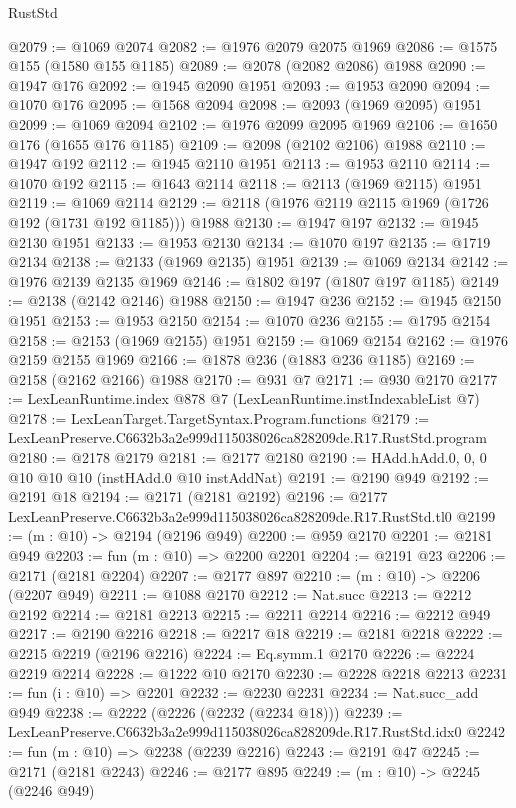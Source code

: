 \begin{lexlean}{RustStd}
\begin{coremodule}
@2079 := @1069 @2074
@2082 := @1976 @2079 @2075 @1969
@2086 := @1575 @155 (@1580 @155 @1185)
@2089 := @2078 (@2082 @2086) @1988
@2090 := @1947 @176
@2092 := @1945 @2090 @1951
@2093 := @1953 @2090
@2094 := @1070 @176
@2095 := @1568 @2094
@2098 := @2093 (@1969 @2095) @1951
@2099 := @1069 @2094
@2102 := @1976 @2099 @2095 @1969
@2106 := @1650 @176 (@1655 @176 @1185)
@2109 := @2098 (@2102 @2106) @1988
@2110 := @1947 @192
@2112 := @1945 @2110 @1951
@2113 := @1953 @2110
@2114 := @1070 @192
@2115 := @1643 @2114
@2118 := @2113 (@1969 @2115) @1951
@2119 := @1069 @2114
@2129 := @2118 (@1976 @2119 @2115 @1969 (@1726 @192 (@1731 @192 @1185))) @1988
@2130 := @1947 @197
@2132 := @1945 @2130 @1951
@2133 := @1953 @2130
@2134 := @1070 @197
@2135 := @1719 @2134
@2138 := @2133 (@1969 @2135) @1951
@2139 := @1069 @2134
@2142 := @1976 @2139 @2135 @1969
@2146 := @1802 @197 (@1807 @197 @1185)
@2149 := @2138 (@2142 @2146) @1988
@2150 := @1947 @236
@2152 := @1945 @2150 @1951
@2153 := @1953 @2150
@2154 := @1070 @236
@2155 := @1795 @2154
@2158 := @2153 (@1969 @2155) @1951
@2159 := @1069 @2154
@2162 := @1976 @2159 @2155 @1969
@2166 := @1878 @236 (@1883 @236 @1185)
@2169 := @2158 (@2162 @2166) @1988
@2170 := @931 @7
@2171 := @930 @2170
@2177 := LexLeanRuntime.index @878 @7 (LexLeanRuntime.instIndexableList @7)
@2178 := LexLeanTarget.TargetSyntax.Program.functions
@2179 := LexLeanPreserve.C6632b3a2e999d115038026ca828209de.R17.RustStd.program
@2180 := @2178 @2179
@2181 := @2177 @2180
@2190 := HAdd.hAdd.{0, 0, 0} @10 @10 @10 (instHAdd.{0} @10 instAddNat)
@2191 := @2190 @949
@2192 := @2191 @18
@2194 := @2171 (@2181 @2192)
@2196 := @2177 LexLeanPreserve.C6632b3a2e999d115038026ca828209de.R17.RustStd.tl0
@2199 := (m : @10) -> @2194 (@2196 @949)
@2200 := @959 @2170
@2201 := @2181 @949
@2203 := fun (m : @10) => @2200 @2201
@2204 := @2191 @23
@2206 := @2171 (@2181 @2204)
@2207 := @2177 @897
@2210 := (m : @10) -> @2206 (@2207 @949)
@2211 := @1088 @2170
@2212 := Nat.succ
@2213 := @2212 @2192
@2214 := @2181 @2213
@2215 := @2211 @2214
@2216 := @2212 @949
@2217 := @2190 @2216
@2218 := @2217 @18
@2219 := @2181 @2218
@2222 := @2215 @2219 (@2196 @2216)
@2224 := Eq.symm.{1} @2170
@2226 := @2224 @2219 @2214
@2228 := @1222 @10 @2170
@2230 := @2228 @2218 @2213
@2231 := fun (i : @10) => @2201
@2232 := @2230 @2231
@2234 := Nat.succ_add @949
@2238 := @2222 (@2226 (@2232 (@2234 @18)))
@2239 := LexLeanPreserve.C6632b3a2e999d115038026ca828209de.R17.RustStd.idx0
@2242 := fun (m : @10) => @2238 (@2239 @2216)
@2243 := @2191 @47
@2245 := @2171 (@2181 @2243)
@2246 := @2177 @895
@2249 := (m : @10) -> @2245 (@2246 @949)

\end{coremodule}
\end{lexlean}
